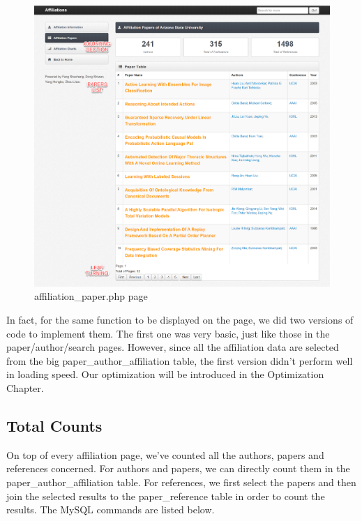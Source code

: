 \documentclass{book}
\begin{document}
\begin{figure}[h]
\centering
\includegraphics[scale=0.35]{img/zlt_aff_demo2.png}
\caption{affiliation\_paper.php page}
\label{fig:zlt2}
\end{figure}

In fact, for the same function to be displayed on the page, we did two versions of code to implement them. The first one was very basic, just like those in the paper/author/search pages. However, since all the affiliation data are selected from the big paper\_author\_affiliation table, the first version didn't perform well in loading speed. Our optimization will be introduced in the Optimization Chapter.



\subsection {Total Counts}
On top of every affiliation page, we've counted all the authors, papers and references concerned. For authors and papers, we can directly count them in the paper\_author\_affiliation table. For references, we first select the papers and then join the selected results to the paper\_reference table in order to count the results. The MySQL commands are listed below.
\end{document}
